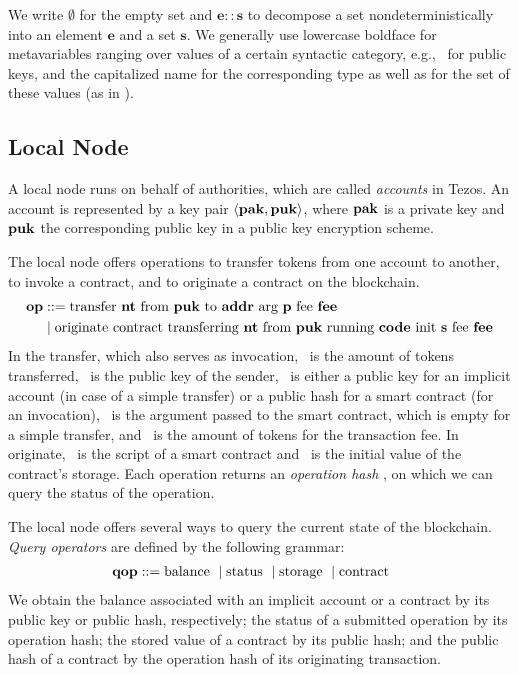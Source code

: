 \documentclass[a4paper]{llncs}
\begin{document}
We write $\emptyset$ for the empty set and $\mathbf{e :: s}$ to
decompose a set nondeterministically into an element $\mathbf{e}$ and a set
$\mathbf{s}$. We generally use lowercase boldface for metavariables
ranging over values of a certain syntactic category, e.g., \PUK\ for
public keys, and the capitalized name for the
corresponding type as well as for the set of these values (as in \TPUK).

\subsection{Local Node}
\label{sec:local-node}

A local node runs on behalf of authorities, which are called
\emph{accounts} in Tezos. An account is represented by a key pair $\Angle{
  \PAK, \PUK
} $, where $\PAK$ is a private key and $\PUK$ the corresponding public
key in a public key encryption scheme.

The local node offers operations to transfer tokens from one account
to another, to invoke a contract, and to originate a contract on the blockchain.
\begin{align*}
  \OP &::= \TRANSFER[\PARAMETER]\NTEZ\PUK\ADDR\MTEZ
  \\&\mid \ORIGINATE\NTEZ\PUK\CODE\INIT\MTEZ
\end{align*}
In the transfer, which also serves as invocation, \NTEZ\ is the amount of tokens transferred, \PUK\ is the public key of the
sender, \ADDR\ is either a public 
key for an implicit account (in case of a simple transfer)  or a
public hash for a smart contract (for an invocation), \PARAMETER\ is
the argument passed to the smart contract, 
which is empty for a simple transfer, and \MTEZ\ is
the amount of tokens for the transaction fee. In originate,  \CODE\ is
the script of a smart contract and \INIT\ is the initial value of the
contract's storage. Each operation returns an \emph{operation hash}
\OPH, on which we can query the status of the operation.

The local node offers several ways to query the current state of
the blockchain.
\emph{Query operators} are defined by the following grammar:
\begin{align*}
  \QOP & ::=
         \GETBALANCE{}%
  \mid \GETSTATUS{}%
  \mid \GETSTORAGE{}%
  \mid \GETCONTRACT{}%
\end{align*}
We obtain the balance associated with an implicit account or a
contract by its public key or public hash, respectively; the status of
a submitted operation by its operation hash; the stored value of a
contract by its public hash; and the public hash of a contract by the
operation hash of its originating transaction.
\end{document}
